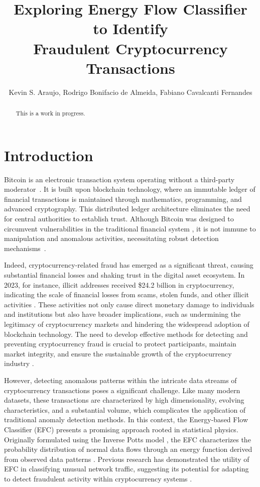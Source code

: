 \documentclass[12pt]{article}
\title{Exploring Energy Flow Classifier to Identify \\ Fraudulent Cryptocurrency Transactions}
\author{Kevin S. Araujo\inst{1}, Rodrigo Bonifacio de Almeida\inst{1}, 
  Fabiano Cavalcanti Fernandes\inst{2} }
\begin{document}
 

\maketitle

\begin{abstract}
  This is a work in progress.
\end{abstract}

\section{Introduction} \label{sec:introduction}
Bitcoin is an electronic transaction system operating without a third-party moderator~\cite{nakamoto2008bitcoin}. It is
built upon blockchain technology, where an immutable ledger of financial transactions is maintained through mathematics,
programming, and advanced cryptography. This distributed ledger architecture eliminates the need for central authorities
to establish trust. Although Bitcoin was designed to circumvent vulnerabilities in the traditional financial system
\cite{nakamoto2008bitcoin}, it is not immune to manipulation and anomalous activities, necessitating robust detection
mechanisms~\cite{fang2022cryptocurrency, zhang2020financial,zainal2018review}. 

Indeed, cryptocurrency-related fraud has emerged as a significant threat, causing substantial financial losses and shaking
trust in the digital asset ecosystem. In 2023, for instance, illicit addresses received \$24.2 billion in cryptocurrency,
indicating the scale of financial losses from scams, stolen funds, and other illicit activities \cite{chainalysis2024cryptocrime}.
These activities not only cause direct monetary damage to individuals and institutions but also have broader implications,
such as undermining the legitimacy of cryptocurrency markets and hindering the widespread adoption of blockchain technology.
The need to develop effective methods for detecting and preventing cryptocurrency fraud is crucial to protect participants,
maintain market integrity, and ensure the sustainable growth of the cryptocurrency industry \cite{scharfman2024, Khiari2025}.

However, detecting anomalous patterns within the intricate data streams of cryptocurrency transactions poses a significant
challenge. Like many modern datasets, these transactions are characterized by high dimensionality, evolving characteristics,
and a substantial volume, which complicates the application of traditional anomaly detection methods. In this context, the
Energy-based Flow Classifier (EFC) presents a promising approach rooted in statistical physics. Originally formulated using
the Inverse Potts model \cite{pontes2019}, the EFC characterizes the probability distribution of normal data flows through
an energy function derived from observed data patterns \cite{pontes2019}. Previous research has demonstrated the utility of
EFC in classifying unusual network traffic, suggesting its potential for adapting to detect fraudulent activity within
cryptocurrency systems \cite{pontes2019, souza2022novelopensetenergybased}.
\end{document}
